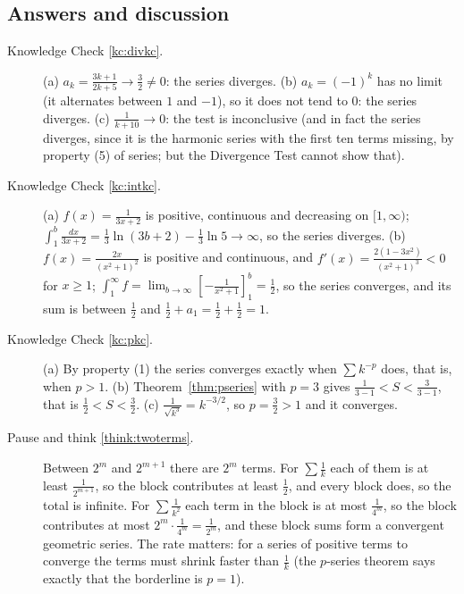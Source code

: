 \documentclass[11pt]{article}
\begin{document}
\subsection*{Answers and discussion}

\begin{description}
  \item[Knowledge Check \ref{kc:divkc}.] (a) $a_k=\frac{3k+1}{2k+5}\to\frac32\ne0$: the series diverges. (b) $a_k=(-1)^k$ has no limit (it alternates between $1$ and $-1$), so it does not tend to $0$: the series diverges. (c) $\frac1{k+10}\to0$: the test is inconclusive (and in fact the series diverges, since it is the harmonic series with the first ten terms missing, by property (5) of series; but the Divergence Test cannot show that).
  \item[Knowledge Check \ref{kc:intkc}.] (a) $f(x)=\frac1{3x+2}$ is positive, continuous and decreasing on $[1,\infty)$; $\int_1^b\frac{dx}{3x+2}=\frac13\ln(3b+2)-\frac13\ln5\to\infty$, so the series diverges. (b) $f(x)=\frac{2x}{(x^2+1)^2}$ is positive and continuous, and $f'(x)=\frac{2(1-3x^2)}{(x^2+1)^3}<0$ for $x\ge1$; $\int_1^\infty f=\lim_{b\to\infty}\left[-\frac1{x^2+1}\right]_1^b=\frac12$, so the series converges, and its sum is between $\frac12$ and $\frac12+a_1=\frac12+\frac12=1$.
  \item[Knowledge Check \ref{kc:pkc}.] (a) By property (1) the series converges exactly when $\sum k^{-p}$ does, that is, when $p>1$. (b) Theorem~\ref{thm:pseries} with $p=3$ gives $\frac1{3-1}<S<\frac3{3-1}$, that is $\frac12<S<\frac32$. (c) $\frac1{\sqrt{k^3}}=k^{-3/2}$, so $p=\frac32>1$ and it converges.
  \item[Pause and think \ref{think:twoterms}.] Between $2^m$ and $2^{m+1}$ there are $2^m$ terms. For $\sum\frac1k$ each of them is at least $\frac1{2^{m+1}}$, so the block contributes at least $\frac12$, and every block does, so the total is infinite. For $\sum\frac1{k^2}$ each term in the block is at most $\frac1{4^m}$, so the block contributes at most $2^m\cdot\frac1{4^m}=\frac1{2^m}$, and these block sums form a convergent geometric series. The rate matters: for a series of positive terms to converge the terms must shrink faster than $\frac1k$ (the $p$-series theorem says exactly that the borderline is $p=1$).

\end{description}
\end{document}
